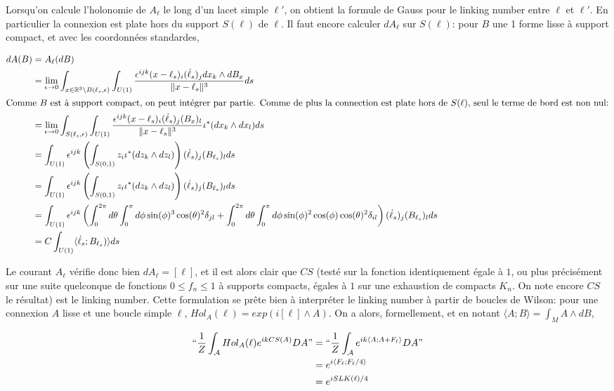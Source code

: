\documentclass[10pt]{article}
\begin{document}
Lorsqu'on calcule l'holonomie de $A_\ell$ le long d'un lacet simple $\ell'$, on obtient la formule de Gauss pour le linking number entre $\ell$ et $\ell'$. En particulier la connexion est plate hors du support $S(\ell)$ de  $\ell$. Il faut encore calculer $dA_\ell$ sur $S(\ell)$: pour $B$ une 1 forme lisse à support compact, et avec les coordonnées standardes,

\begin{align*}
  dA(B)&=A_\ell(dB)\\
  &=\lim_{\epsilon\to 0}\int_{x\in\mathbb{R}^3\setminus B(\ell_s,\epsilon)} \int_{U(1)} \frac{\epsilon^{ijk}(x-\ell_s)_i(\dot\ell_s)_j dx_k\wedge dB_x}{\|x-\ell_s\|^3} ds\\
  \intertext{Comme $B$ est à support compact, on peut intégrer par partie. Comme de plus la connection est plate hors de $S(\ell)$, seul le terme de bord est non nul:}
  &=\lim_{\epsilon\to 0}\int_{S(\ell_s,\epsilon)}\int_{U(1)} \frac{\epsilon^{ijk}(x-\ell_s)_i(\dot\ell_s)_j  (B_x)_l}{\|x-\ell_s\|^3} \iota^*(dx_k\wedge dx_l) ds\\
  &=\int_{U(1)} \epsilon^{ijk} \left(\int_{S(0,1)}z_i   \iota^*(dz_k\wedge dz_l) \right) (\dot\ell_s)_j(B_{\ell_s})_l ds\\
  &=\int_{U(1)} \epsilon^{ijk} \left(\int_{S(0,1)}z_i   \iota^*(dz_k\wedge dz_l) \right) (\dot\ell_s)_j(B_{\ell_s})_l ds\\
  &=\int_{U(1)} \epsilon^{ijk} \left( \int_0^{2\pi} d\theta \int_0^{\pi} d\phi \sin(\phi)^3\cos(\theta)^2 \delta_{jl}+\int_0^{2\pi} d\theta \int_0^{\pi} d\phi \sin(\phi)^2 \cos(\phi) \cos(\theta)^2 \delta_{il} \right)(\dot\ell_s)_j(B_{\ell_s})_l ds\\
&=C \int_{U(1)} \langle \dot\ell_s;B_{\ell_s})\rangle ds
  \end{align*}

Le courant $A_\ell$ vérifie donc bien $dA_\ell=[\ell]$, et il est alors clair que $CS$ (testé sur la fonction identiquement égale à $1$, ou plus précisément sur une suite quelconque de fonctions $0\leq f_n\leq 1$ à supports compacts, égales à $1$ sur une exhaustion de compacts $K_n$. On note encore $CS$ le résultat) est le linking number. Cette formulation se prête bien à interpréter le linking number à partir de boucles de Wilson: pour une connexion $A$ lisse et une boucle simple $\ell$, $Hol_A(\ell)=exp(i [\ell]\wedge A)$. On a alors, formellement, et en notant $\langle A; B \rangle=\int_M A\wedge dB$,

\begin{align*}
  ``\frac{1}{Z}\int_{\mathcal{A}} Hol_A(\ell) e^{i k CS(A)} DA "&=``\frac{1}{Z}\int_{\mathcal{A}} e^{i k \langle A ;A+F_\ell \rangle } DA"\\
&=e^{i\langle F_\ell;F_\ell/4 \rangle}\\
&=e^{iSLK(\ell)/4}\\
\end{align*}
\end{document}
